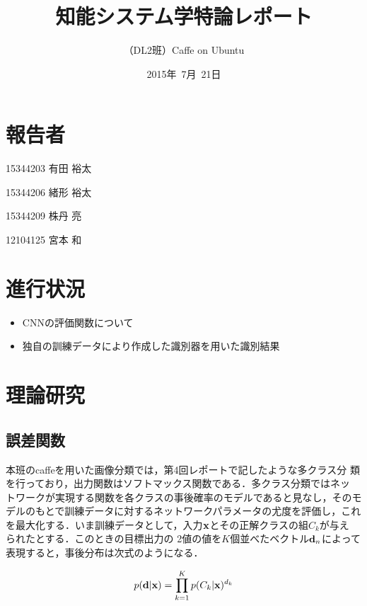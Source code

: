 \documentclass[a4paper,10pt]{jsarticle}
\title{知能システム学特論レポート}
\author{
（DL2班）Caffe on Ubuntu\\
}
\date{2015年\ 7月\ 21日}
\begin{document}
\maketitle
\section{報告者}
\begin{list}{}{}
 \item 15344203\hspace{0.5cm} 有田 裕太
 \item 15344206\hspace{0.5cm} 緒形 裕太
 \item 15344209\hspace{0.5cm} 株丹 亮
 \item 12104125\hspace{0.5cm} 宮本 和
\end{list}

\section{進行状況}

\begin{itemize}
\item CNNの評価関数について
\item 独自の訓練データにより作成した識別器を用いた識別結果
\end{itemize}

\section{理論研究}

\subsection{誤差関数}
本班のcaffeを用いた画像分類では，第4回レポートで記したような多クラス分
類を行っており，出力関数はソフトマックス関数である．多クラス分類ではネッ
トワークが実現する関数を各クラスの事後確率のモデルであると見なし，そのモ
デルのもとで訓練データに対するネットワークパラメータの尤度を評価し，これ
を最大化する．いま訓練データとして，入力${\bf x}$とその正解クラスの組$C_k$が与え
られたとする．このときの目標出力の
2値の値を$K$個並べたベクトル${\bf
d}_n$によって表現すると，事後分布は次式のようになる．

\begin{equation}
 p({\bf d}|{\bf x}) = \prod_{k=1}^{K}p(C_k|{\bf x})^{d_k}
\end{equation}
\end{document}
